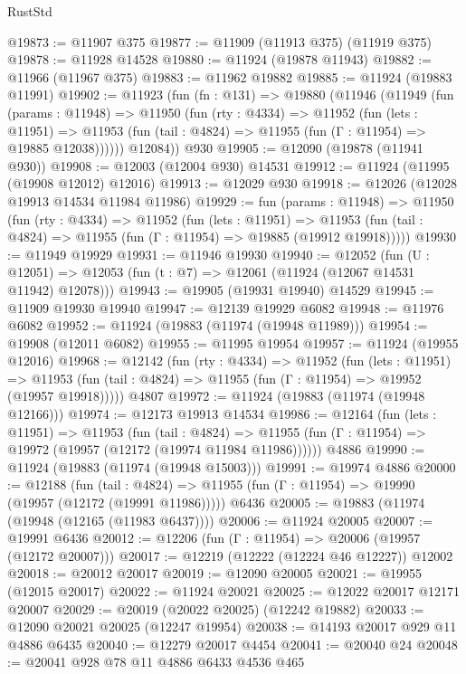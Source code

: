 \begin{lexlean}{RustStd}
\begin{coremodule}
{\begin{coremodule}
{{{{{{{{{{{{{{{{{{{{{{{{{{{{{{{{{{{{{{{{{{{{{{{{{{{{{{{{{{{{{{{{{{{{{{{{{{{{{{{{@19873 := @11907 @375
@19877 := @11909 (@11913 @375) (@11919 @375)
@19878 := @11928 @14528
@19880 := @11924 (@19878 @11943)
@19882 := @11966 (@11967 @375)
@19883 := @11962 @19882
@19885 := @11924 (@19883 @11991)
@19902 := @11923
    (fun (fn : @131) =>
    @19880
      (@11946
        (@11949
          (fun (params : @11948) =>
          @11950
            (fun (rty : @4334) =>
            @11952
              (fun (lets : @11951) =>
              @11953 (fun (tail : @4824) => @11955 (fun (Γ : @11954) => @19885 @12038))))))
        @12084))
    @930
@19905 := @12090 (@19878 (@11941 @930))
@19908 := @12003 (@12004 @930) @14531
@19912 := @11924 (@11995 (@19908 @12012) @12016)
@19913 := @12029 @930
@19918 := @12026 (@12028 @19913 @14534 @11984 @11986)
@19929 := fun (params : @11948) =>
  @11950
    (fun (rty : @4334) =>
    @11952
      (fun (lets : @11951) =>
      @11953 (fun (tail : @4824) => @11955 (fun (Γ : @11954) => @19885 (@19912 @19918)))))
@19930 := @11949 @19929
@19931 := @11946 @19930
@19940 := @12052
    (fun (U : @12051) => @12053 (fun (t : @7) => @12061 (@11924 (@12067 @14531 @11942) @12078)))
@19943 := @19905 (@19931 @19940) @14529
@19945 := @11909 @19930 @19940
@19947 := @12139 @19929 @6082
@19948 := @11976 @6082
@19952 := @11924 (@19883 (@11974 (@19948 @11989)))
@19954 := @19908 (@12011 @6082)
@19955 := @11995 @19954
@19957 := @11924 (@19955 @12016)
@19968 := @12142
    (fun (rty : @4334) =>
    @11952
      (fun (lets : @11951) =>
      @11953 (fun (tail : @4824) => @11955 (fun (Γ : @11954) => @19952 (@19957 @19918)))))
    @4807
@19972 := @11924 (@19883 (@11974 (@19948 @12166)))
@19974 := @12173 @19913 @14534
@19986 := @12164
    (fun (lets : @11951) =>
    @11953
      (fun (tail : @4824) =>
      @11955 (fun (Γ : @11954) => @19972 (@19957 (@12172 (@19974 @11984 @11986))))))
    @4886
@19990 := @11924 (@19883 (@11974 (@19948 @15003)))
@19991 := @19974 @4886
@20000 := @12188
    (fun (tail : @4824) => @11955 (fun (Γ : @11954) => @19990 (@19957 (@12172 (@19991 @11986)))))
    @6436
@20005 := @19883 (@11974 (@19948 (@12165 (@11983 @6437))))
@20006 := @11924 @20005
@20007 := @19991 @6436
@20012 := @12206 (fun (Γ : @11954) => @20006 (@19957 (@12172 @20007)))
@20017 := @12219 (@12222 (@12224 @46 @12227)) @12002
@20018 := @20012 @20017
@20019 := @12090 @20005
@20021 := @19955 (@12015 @20017)
@20022 := @11924 @20021
@20025 := @12022 @20017 @12171 @20007
@20029 := @20019 (@20022 @20025) (@12242 @19882)
@20033 := @12090 @20021 @20025 (@12247 @19954)
@20038 := @14193 @20017 @929 @11 @4886 @6435
@20040 := @12279 @20017 @4454
@20041 := @20040 @24
@20048 := @20041 @928 @78 @11 @4886 @6433 @4536 @465
}}}}}}}}}}}}}}}}}}}}}}}}}}}}}}}}}}}}}}}}}}}}}}}}}}}}}}}}}}}}}}}}}}}}}}}}}}}}}}}}
\end{coremodule}}
\end{coremodule}
\end{lexlean}
